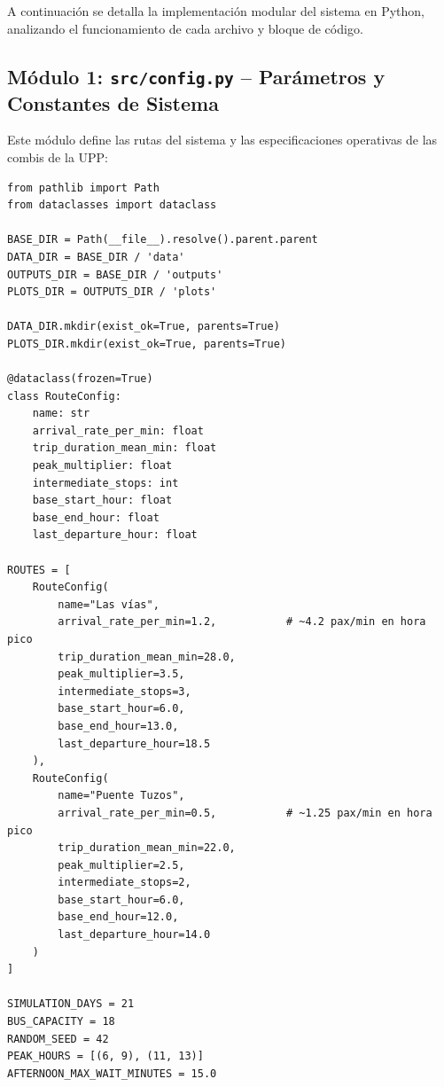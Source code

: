 \documentclass[12pt,letterpaper]{article}
\begin{document}
A continuación se detalla la implementación modular del sistema en Python, analizando el funcionamiento de cada archivo y bloque de código.

\subsection{Módulo 1: \texttt{src/config.py} -- Parámetros y Constantes de Sistema}
Este módulo define las rutas del sistema y las especificaciones operativas de las combis de la UPP:

\begin{lstlisting}[caption={Código Fuente de src/config.py}]
from pathlib import Path 
from dataclasses import dataclass 

BASE_DIR = Path(__file__).resolve().parent.parent
DATA_DIR = BASE_DIR / 'data'
OUTPUTS_DIR = BASE_DIR / 'outputs'
PLOTS_DIR = OUTPUTS_DIR / 'plots'

DATA_DIR.mkdir(exist_ok=True, parents=True)
PLOTS_DIR.mkdir(exist_ok=True, parents=True)

@dataclass(frozen=True)
class RouteConfig:
    name: str
    arrival_rate_per_min: float
    trip_duration_mean_min: float
    peak_multiplier: float
    intermediate_stops: int
    base_start_hour: float
    base_end_hour: float
    last_departure_hour: float

ROUTES = [
    RouteConfig(
        name="Las vías",
        arrival_rate_per_min=1.2,           # ~4.2 pax/min en hora pico
        trip_duration_mean_min=28.0,
        peak_multiplier=3.5,
        intermediate_stops=3,
        base_start_hour=6.0,
        base_end_hour=13.0,
        last_departure_hour=18.5
    ),
    RouteConfig(
        name="Puente Tuzos",
        arrival_rate_per_min=0.5,           # ~1.25 pax/min en hora pico
        trip_duration_mean_min=22.0,
        peak_multiplier=2.5,
        intermediate_stops=2,
        base_start_hour=6.0,
        base_end_hour=12.0,
        last_departure_hour=14.0
    )
]

SIMULATION_DAYS = 21
BUS_CAPACITY = 18
RANDOM_SEED = 42
PEAK_HOURS = [(6, 9), (11, 13)]
AFTERNOON_MAX_WAIT_MINUTES = 15.0
\end{lstlisting}
\end{document}
